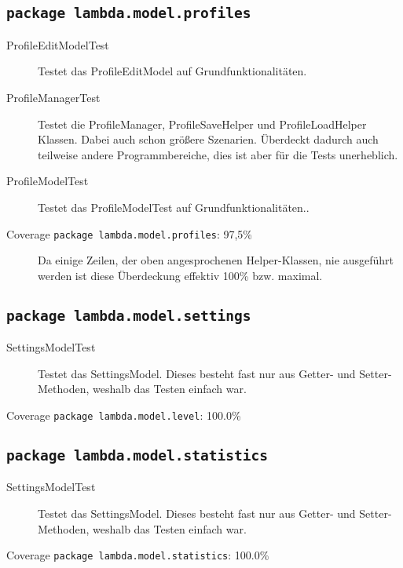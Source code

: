 \subsection{\texttt{package lambda.model.profiles}}

\begin{description}
\item[ProfileEditModelTest] Testet das ProfileEditModel auf Grundfunktionalitäten.

\item[ProfileManagerTest] Testet die ProfileManager, ProfileSaveHelper und ProfileLoadHelper Klassen. Dabei auch schon größere Szenarien. Überdeckt dadurch auch teilweise andere Programmbereiche, dies ist aber für die Tests unerheblich.

\item[ProfileModelTest] Testet das ProfileModelTest auf Grundfunktionalitäten..

\item[Coverage \texttt{package lambda.model.profiles}: 97,5\%] Da einige Zeilen, der oben angesprochenen Helper-Klassen, nie ausgeführt werden ist diese Überdeckung effektiv 100\% bzw. maximal.
\end{description}

\subsection{\texttt{package lambda.model.settings}}
\begin{description}
\item[SettingsModelTest] Testet das SettingsModel. Dieses besteht fast nur aus Getter- und Setter- Methoden, weshalb das Testen einfach war.

\item[Coverage \texttt{package lambda.model.level}: 100.0\%] 
\end{description}

\subsection{\texttt{package lambda.model.statistics}}
\begin{description}
\item[SettingsModelTest] Testet das SettingsModel. Dieses besteht fast nur aus Getter- und Setter- Methoden, weshalb das Testen einfach war.

\item[Coverage \texttt{package lambda.model.statistics}: 100.0\%] 
\end{description}